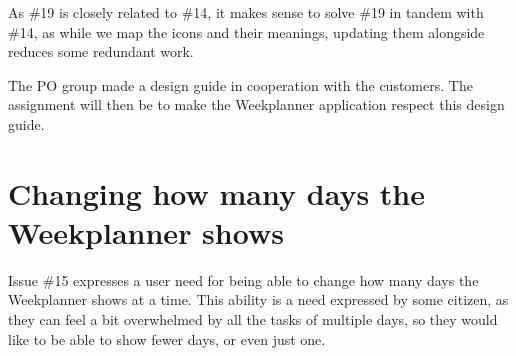 As \#19 is closely related to \#14, it makes sense to solve \#19 in tandem with \#14, as while we map the icons and their meanings, updating them alongside reduces some redundant work.

The \gls{PO} group made a design guide in cooperation with the customers. The assignment will then be to make the Weekplanner application respect this design guide.

\section{Changing how many days the Weekplanner shows} \label{sec:weekPlannerDaysToShow}

Issue \#15 expresses a user need for being able to change how many days the Weekplanner shows at a time. This ability is a need expressed by some citizen, as they can feel a bit overwhelmed by all the tasks of multiple days, so they would like to be able to show fewer days, or even just one.
